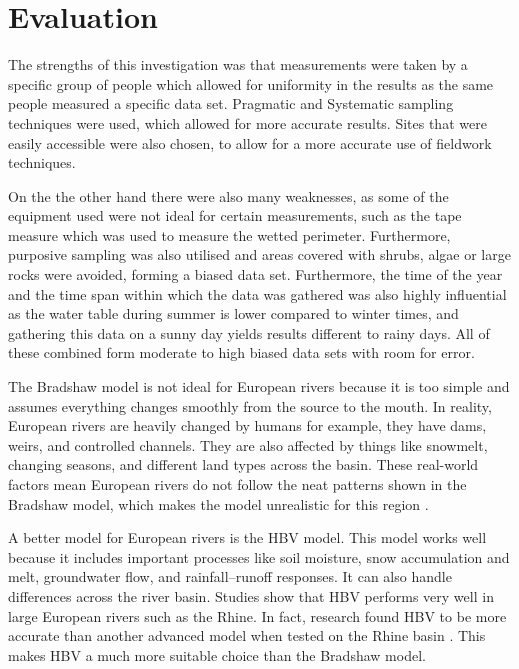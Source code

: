 \section{Evaluation}

The strengths of this investigation was that measurements were taken by a specific group of people which allowed for uniformity in the results as the same people measured a specific data set. Pragmatic and Systematic sampling techniques were used, which allowed for more accurate results. Sites that were easily accessible were also chosen, to allow for a more accurate use of fieldwork techniques. 

On the the other hand there were also many weaknesses, as some of the equipment used were not ideal for certain measurements, such as the tape measure which was used to measure the wetted perimeter. Furthermore, purposive sampling was also utilised and areas covered with shrubs, algae or large rocks were avoided, forming a biased data set. Furthermore, the time of the year and the time span within which the data was gathered was also highly influential as the water table during summer is lower compared to winter times, and gathering this data on a sunny day yields results different to rainy days. All of these combined form moderate to high biased data sets with room for error. 

The Bradshaw model is not ideal for European rivers because it is too simple and assumes everything changes smoothly from the source to the mouth. In reality, European rivers are heavily changed by humans for example, they have dams, weirs, and controlled channels. They are also affected by things like snowmelt, changing seasons, and different land types across the basin. These real-world factors mean European rivers do not follow the neat patterns shown in the Bradshaw model, which makes the model unrealistic for this region \parencite{seibert2022hbv}.

A better model for European rivers is the HBV model. This model works well because it includes important processes like soil moisture, snow accumulation and melt, groundwater flow, and rainfall–runoff responses. It can also handle differences across the river basin. Studies show that HBV performs very well in large European rivers such as the Rhine. In fact, research found HBV to be more accurate than another advanced model when tested on the Rhine basin \parencite{telinde2008rhine}. This makes HBV a much more suitable choice than the Bradshaw model.

